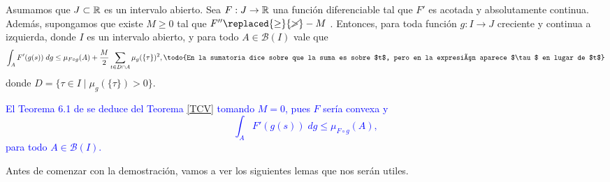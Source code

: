\begin{thm}\label{TCV}
 
Asumamos que $J\subset\mathbb{R}$ es un intervalo abierto. Sea $F:J\to \mathbb{R}$ una función diferenciable tal que $F'$ es acotada y absolutamente continua. Además,  supongamos que existe $M\geq 0$ tal que $F''\replaced{\geq}{\cancel{>}}-M$ . Entonces, para toda función $g:I\to J$ creciente y  continua a izquierda,  donde $I$ es un intervalo abierto, y para todo $A\in \mathcal{B}(I)$ vale que
$$\int_{A}F'(g(s)) \; dg\leq \mu_{F\circ g}(A)+\dfrac{M}{2}\sum_{t\in D\cap A}\mu_{g}(\{\tau\})^2,\textrm{\todo{En la sumatoria dice sobre que la suma es sobre $t$, pero en la expresión aparece $\tau$ en lugar de $t$}}$$
donde $D=\{\tau\in I \mid \mu_{g}(\{\tau\})>0\}$.\label{Teorema medidas}
\end{thm}
 

\begin{obs} \label{Teorema 6.1}
\textcolor{blue}{El Teorema 6.1  de \cite{P.Mazzone} se deduce del Teorema  \ref{TCV} tomando $M=0$, pues $F$ sería convexa  y 
$$\int_{A}F'(g(s)) \; dg\leq \mu_{F\circ g}(A),$$
para todo $A\in \mathcal{B}(I)$.}
\end{obs}
Antes de comenzar con la demostración, vamos a ver los siguientes lemas que nos serán utiles.

